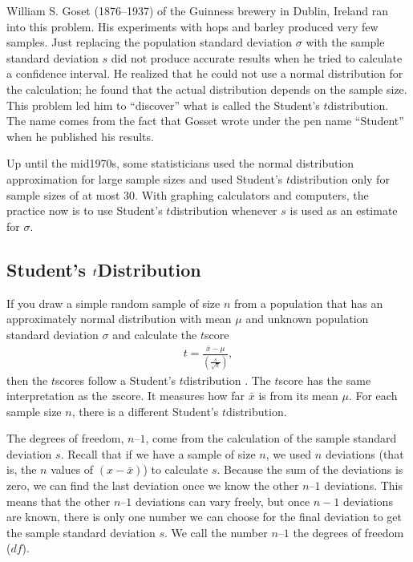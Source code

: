 \documentclass[letterpaper,10pt,english]{jupyterBook}
\begin{document}
\sphinxAtStartPar
William S. Goset (1876–1937) of the Guinness brewery in Dublin, Ireland ran into this problem. His experiments with hops and barley produced very few samples. Just replacing the population standard deviation \(\sigma\) with the sample standard deviation \(s\) did not produce accurate results when he tried to calculate a confidence interval. He realized that he could not use a normal distribution for the calculation; he found that the actual distribution depends on the sample size. This problem led him to “discover” what is called the Student’s \(t\)\sphinxhyphen{}distribution. The name comes from the fact that Gosset wrote under the pen name “Student” when he published his results.

\sphinxAtStartPar
Up until the mid\sphinxhyphen{}1970s, some statisticians used the normal distribution approximation for large sample sizes and used Student’s \(t\)\sphinxhyphen{}distribution only for sample sizes of at most \(30\). With graphing calculators and computers, the practice now is to use Student’s \(t\)\sphinxhyphen{}distribution whenever \(s\) is used as an estimate for \(\sigma\).


\subsection{Student’s \protect\(t\protect\)\sphinxhyphen{}Distribution}
\label{\detokenize{Ch5 Confidence Intervals/5.3 Student's t-Distribution:id1}}
\sphinxAtStartPar
If you draw a simple random sample of size \(n\) from a population that has an approximately normal distribution with mean \(\mu\) and unknown population standard deviation \(\sigma\) and calculate the \(t\)\sphinxhyphen{}score
\begin{equation*}
\begin{split}t = \frac{\bar{x} - \mu}{\left(\frac{s}{\sqrt{n}}\right)},\end{split}
\end{equation*}
\sphinxAtStartPar
then the \(t\)\sphinxhyphen{}scores follow a Student’s \(t\)\sphinxhyphen{}distribution . The \(t\)\sphinxhyphen{}score has the same interpretation as the \(z\)\sphinxhyphen{}score. It measures how far \(\bar{x}\) is from its mean \(\mu\). For each sample size \(n\), there is a different Student’s \(t\)\sphinxhyphen{}distribution.

\sphinxAtStartPar
The degrees of freedom, \(n – 1\), come from the calculation of the sample standard deviation \(s\). Recall that if we have a sample of size \(n\), we used \(n\) deviations (that is, the \(n\) values of \((x - \bar{x})\)) to calculate \(s\). Because the sum of the deviations is zero, we can find the last deviation once we know the other \(n – 1\) deviations. This means that the other \(n – 1\) deviations can vary freely, but once \(n-1\) deviations are known, there is only one number we can choose for the final deviation to get the sample standard deviation \(s\). We call the number \(n – 1\) the degrees of freedom (\(df\)).
\end{document}
